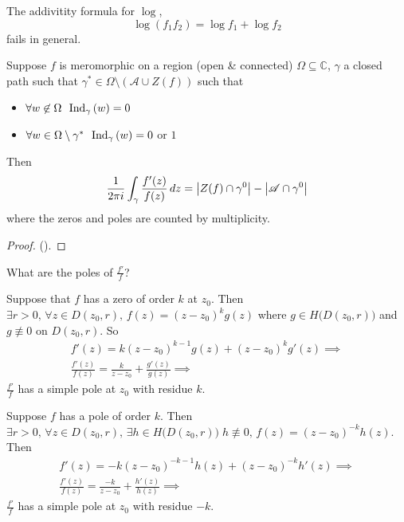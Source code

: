\documentclass[11pt, oneside]{book}
\begin{document}
\begin{note}
  The addivitity formula for $\log$,
  \begin{equation*}
    \log(f_1 f_2) = \log f_1 + \log f_2
  \end{equation*}
  fails in general.
\end{note}

\begin{thm}\label{thm:argument_principle}
  Suppose $f$ is meromorphic on a region (open \& connected) $\Omega \subseteq \mathbb{C}$, $\gamma$ a closed path such that $\gamma^* \in \Omega \setminus (\mathscr{A} \cup Z(f))$ such that
  \begin{itemize}
    \item $\forall w \not\in \Omega \enspace \operatorname{Ind}_{\gamma}\left( w \right) = 0$
    \item $\forall w \in \Omega \setminus \gamma^* \enspace \operatorname{Ind}_{\gamma}\left( w \right) = 0$ or $1$
  \end{itemize}
  Then
  \begin{equation*}
    \frac{1}{2 \pi i} \int_{\gamma} \frac{f'(z)}{f(z)} \mathop{}\!d{z} = \left|Z(f) \cap \gamma^0\right| - \left|\mathscr{A} \cap \gamma^0\right|
  \end{equation*}
  where the zeros and poles are counted by multiplicity.
\end{thm}

\begin{proof}
  ().
\end{proof}

 What are the poles of $\frac{f'}{f}$?

Suppose that $f$ has a zero of order $k$ at $z_0$. Then $\exists r > 0, \, \forall z \in D(z_0, r), \, f(z) = (z - z_0)^k g(z)$ where $g \in H\big(D(z_0, r)\big)$ and $g \not\equiv 0$ on $D(z_0, r)$. So
\begin{gather*}
  f'(z) = k(z - z_0)^{k - 1} g(z) + (z - z_0)^k g'(z) \implies \\
  \frac{f'(z)}{f(z)} = \frac{k}{z - z_0} + \frac{g'(z)}{g(z)} \implies
\end{gather*}
$\frac{f'}{f}$ has a simple pole at $z_0$ with residue $k$.

Suppose $f$ has a pole of order $k$. Then $\exists r > 0, \, \forall z \in D(z_0, r), \, \exists h \in H\big(D(z_0, r)\big) \; h \not\equiv 0, \, f(z) = (z - z_0)^{-k} h(z)$. Then
\begin{gather*}
  f'(z) = -k (z - z_0)^{-k-1} h(z) + (z - z_0)^{-k} h'(z) \implies \\
  \frac{f'(z)}{f(z)} = \frac{-k}{z - z_0} + \frac{h'(z)}{h(z)} \implies
\end{gather*}
$\frac{f'}{f}$ has a simple pole at $z_0$ with residue $-k$.
\end{document}
